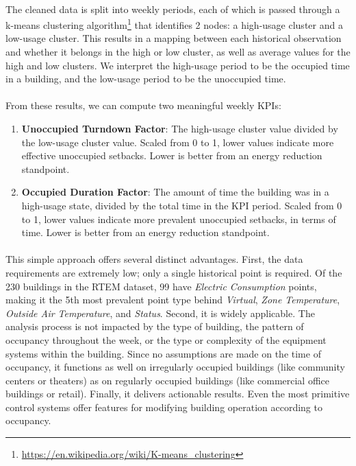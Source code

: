 \documentclass[a4paper]{article}
\begin{document}
\paragraph{}
The cleaned data is split into weekly periods, each of which is passed through a k-means clustering algorithm\footnote{\url{https://en.wikipedia.org/wiki/K-means\_clustering}} that identifies 2 nodes: a high-usage cluster and a low-usage cluster. This results in a mapping between each historical observation and whether it belongs in the high or low cluster, as well as average values for the high and low clusters. We interpret the high-usage period to be the occupied time in a building, and the low-usage period to be the unoccupied time.

\paragraph{}
From these results, we can compute two meaningful weekly KPIs:
\begin{enumerate}
\item{\textbf{Unoccupied Turndown Factor}: The high-usage cluster value divided by the low-usage cluster value. Scaled from 0 to 1, lower values indicate more effective unoccupied setbacks. Lower is better from an energy reduction standpoint.}
\item{\textbf{Occupied Duration Factor}: The amount of time the building was in a high-usage state, divided by the total time in the KPI period. Scaled from 0 to 1, lower values indicate more prevalent unoccupied setbacks, in terms of time.  Lower is better from an energy reduction standpoint.}
\end{enumerate}

\paragraph{}
This simple approach offers several distinct advantages. First, the data requirements are extremely low; only a single historical point is required. Of the 230 buildings in the RTEM dataset, 99 have \textit{Electric Consumption} points, making it the 5th most prevalent point type behind \textit{Virtual}, \textit{Zone Temperature}, \textit{Outside Air Temperature}, and \textit{Status}. Second, it is widely applicable. The analysis process is not impacted by the type of building, the pattern of occupancy throughout the week, or the type or complexity of the equipment systems within the building. Since no assumptions are made on the time of occupancy, it functions as well on irregularly occupied buildings (like community centers or theaters) as on regularly occupied buildings (like commercial office buildings or retail). Finally, it delivers actionable results. Even the most primitive control systems offer features for modifying building operation according to occupancy.
\end{document}
